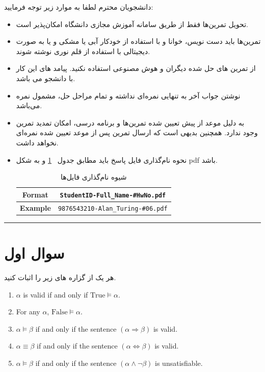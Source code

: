 \documentclass[a4paper,10pt]{article}
\begin{document}
دانشجویان محترم لطفا به موارد زیر توجه فرمایید:
\begin{itemize}
\itemsep0em
\item
	تحويل تمرين‌ها فقط از طريق سامانه  آموزش مجازی دانشگاه امکان‌‌پذیر است.
\item 
	تمرین‌ها باید دست نویس، خوانا و با استفاده از خودکار آبی یا مشکی و یا به صورت دیجیتالی با استفاده از قلم نوری نوشته شوند. 
\item
از تمرین های حل شده دیگران و هوش مصنوعی استفاده نکنید. پیامد های این کار با دانشجو می باشد.
\item
	نوشتن جواب آخر به تنهايى نمره‌ای نداشته و تمام مراحل حل، مشمول نمره می‌باشد.
\item 
	به دلیل موعد از پیش تعیین شده تمرین‌ها و برنامه درسی، امکان تمدید تمرین وجود ندارد. همچنین بدیهی است که ارسال تمرین پس از موعد تعیین شده نمره‌ای نخواهد داشت.
	
\item نحوه نام‌گذاری فایل پاسخ باید مطابق جدول ~\ref{tab:file_format}
و به شکل pdf باشد.

\begin{table}[h]
	\centering
	\begin{tabular}{|c|c|}
		\hline
		\textbf{Format} & \texttt{StudentID-Full\_Name-\#HwNo.pdf} \\
		\hline
		\textbf{Example} & \texttt{9876543210-Alan\_Turing-\#06.pdf} \\
		\hline
	\end{tabular}
	\caption{شیوه نام‌گذاری فایل‌ها}
	\label{tab:file_format}
\end{table}
    
    
\end{itemize}
\rule{\linewidth}{0.4pt}




\section{سوال اول}

هر یک از گزاره های زیر را اثبات کنید.
\begin{latin} 
\begin{enumerate}
    \item $\alpha$ is valid if and only if $\text{True} \models \alpha$.
    \item For any $\alpha$, $\text{False} \models \alpha$.
    \item $\alpha \models \beta$ if and only if the sentence $(\alpha \Rightarrow \beta)$ is valid.
    \item $\alpha \equiv \beta$ if and only if the sentence $(\alpha \Leftrightarrow \beta)$ is valid.
    \item $\alpha \models \beta$ if and only if the sentence $(\alpha \wedge \neg \beta)$ is unsatisfiable.
\end{enumerate}
\end{latin}
\end{document}
